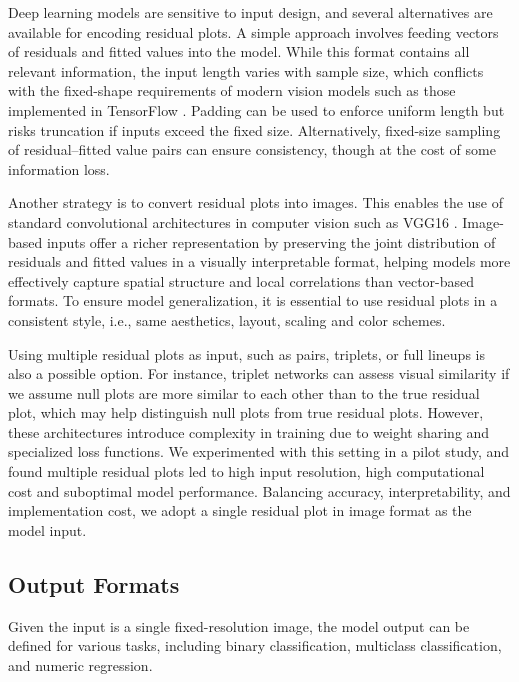 \documentclass[]{interact}
\theoremstyle{plain}%
\theoremstyle{definition}
\theoremstyle{remark}
\begin{document}
Deep learning models are sensitive to input design, and several
alternatives are available for encoding residual plots. A simple
approach involves feeding vectors of residuals and fitted values into
the model. While this format contains all relevant information, the
input length varies with sample size, which conflicts with the
fixed-shape requirements of modern vision models such as those
implemented in TensorFlow \citep{abadi2016tensorflow}. Padding can be
used to enforce uniform length but risks truncation if inputs exceed the
fixed size. Alternatively, fixed-size sampling of residual--fitted value
pairs can ensure consistency, though at the cost of some information
loss.

Another strategy is to convert residual plots into images. This enables
the use of standard convolutional architectures in computer vision such
as VGG16 \citep{simonyan2014very}. Image-based inputs offer a richer
representation by preserving the joint distribution of residuals and
fitted values in a visually interpretable format, helping models more
effectively capture spatial structure and local correlations than
vector-based formats. To ensure model generalization, it is essential to
use residual plots in a consistent style, i.e., same aesthetics, layout,
scaling and color schemes.

Using multiple residual plots as input, such as pairs, triplets, or full
lineups is also a possible option. For instance, triplet networks
\citep{chopra2005learning} can assess visual similarity if we assume
null plots are more similar to each other than to the true residual
plot, which may help distinguish null plots from true residual plots.
However, these architectures introduce complexity in training due to
weight sharing and specialized loss functions. We experimented with this
setting in a pilot study, and found multiple residual plots led to high
input resolution, high computational cost and suboptimal model
performance. Balancing accuracy, interpretability, and implementation
cost, we adopt a single residual plot in image format as the model
input.

\subsection{Output Formats}\label{output-formats}

Given the input is a single fixed-resolution image, the model output can
be defined for various tasks, including binary classification,
multiclass classification, and numeric regression.
\end{document}
